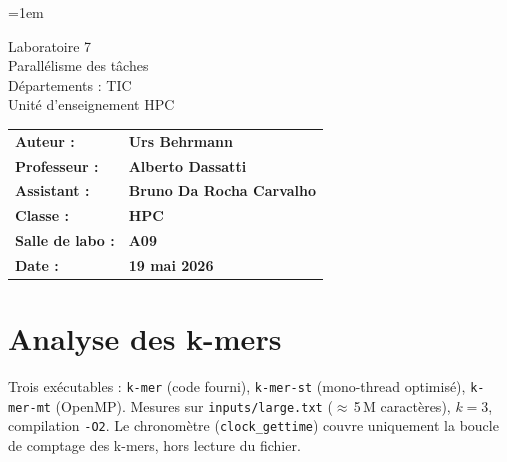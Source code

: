 \documentclass[a4paper,12pt]{article}
\author{Urs Behrmann}
\begin{document}
\emergencystretch=1em %

\thispagestyle{firstpage}


\vspace*{2cm}
\begin{center}
    \Huge Laboratoire 7 \\
    \vspace{0.2cm}
    \Large Parallélisme des tâches\\
    \vspace{1cm}
    \small Départements : TIC\\
    Unité d'enseignement HPC\\
\end{center}

\vspace{9cm}

\renewcommand{\arraystretch}{1.5} %

\begin{flushleft}
    \begin{tabular}{@{}l l@{}}
        \textbf{Auteur :}        & \textbf{Urs Behrmann} \\
        \textbf{Professeur :}    & \textbf{Alberto Dassatti} \\
        \textbf{Assistant :}     & \textbf{Bruno Da Rocha Carvalho} \\
        \textbf{Classe :}        & \textbf{HPC} \\
        \textbf{Salle de labo :} & \textbf{A09} \\
        \textbf{Date :}          & \textbf{19 mai 2026} \\
    \end{tabular}
\end{flushleft}

\newpage

\pagestyle{otherpages}

\tableofcontents

\newpage

\section{Analyse des k-mers}

Trois exécutables : \texttt{k-mer} (code fourni), \texttt{k-mer-st} (mono-thread optimisé), \texttt{k-mer-mt} (OpenMP). Mesures sur \texttt{inputs/large.txt} ($\approx$\,5\,M caractères), $k = 3$, compilation \texttt{-O2}. Le chronomètre (\texttt{clock\_gettime}) couvre uniquement la boucle de comptage des k-mers, hors lecture du fichier.
\end{document}
